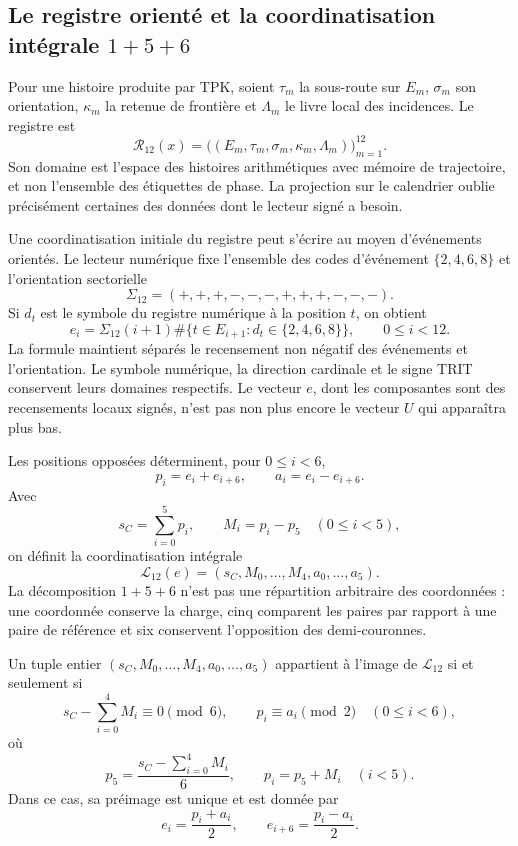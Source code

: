 \subsection{Le registre orienté et la coordinatisation intégrale \texorpdfstring{\(1+5+6\)}{1+5+6}}
\label{subsec:k-registro-integral}

Pour une histoire produite par TPK, soient \(\tau_m\) la sous-route sur
\(E_m\), \(\sigma_m\) son orientation, \(\kappa_m\) la retenue de
frontière et \(\Lambda_m\) le livre local des incidences. Le registre est
\[
 \mathcal R_{12}(x)=
 \bigl((E_m,\tau_m,\sigma_m,\kappa_m,\Lambda_m)\bigr)_{m=1}^{12}.
\]
Son domaine est l'espace des histoires arithmétiques avec mémoire de trajectoire, et non l'ensemble des
étiquettes de phase. La projection sur le calendrier oublie précisément certaines
des données dont le lecteur signé a besoin.

Une coordinatisation initiale du registre peut s’écrire au moyen d’événements
orientés. Le lecteur numérique fixe l’ensemble des codes d’événement
\(\{2,4,6,8\}\) et l’orientation sectorielle
\[
 \Sigma_{12}=(+,+,+,-,-,-,+,+,+,-,-,-).
\]
Si \(d_t\) est le symbole du registre numérique à la position \(t\), on obtient
\[
 e_i=\Sigma_{12}(i+1)
 \#\{t\in E_{i+1}:d_t\in\{2,4,6,8\}\},
 \qquad0\leq i<12.
\]
La formule maintient séparés le recensement non négatif des événements et l'orientation. Le symbole numérique, la direction cardinale et le signe TRIT conservent leurs domaines respectifs. Le vecteur \(e\), dont les composantes sont des recensements locaux signés, n'est pas non plus encore le vecteur \(U\) qui apparaîtra plus bas.

Les positions opposées déterminent, pour \(0\leq i<6\),
\[
 p_i=e_i+e_{i+6},\qquad a_i=e_i-e_{i+6}.
\]
Avec
\[
 s_C=\sum_{i=0}^{5}p_i,\qquad M_i=p_i-p_5\quad(0\leq i<5),
\]
on définit la coordinatisation intégrale
\[
 \mathcal L_{12}(e)
 =(s_C,M_0,\ldots,M_4,a_0,\ldots,a_5).
\]
La décomposition \(1+5+6\) n'est pas une répartition arbitraire des coordonnées :
une coordonnée conserve la charge, cinq comparent les paires par rapport à une
paire de référence et six conservent l'opposition des demi-couronnes.

\begin{lemma}
\label{lem:k-carta-integral}
Un tuple entier \((s_C,M_0,\ldots,M_4,a_0,\ldots,a_5)\) appartient à l'image de \(\mathcal L_{12}\) si et seulement si
\[
 s_C-\sum_{i=0}^{4}M_i\equiv0\pmod6,
 \qquad p_i\equiv a_i\pmod2\quad(0\leq i<6),
\]
où
\[
 p_5=\frac{s_C-\sum_{i=0}^{4}M_i}{6},\qquad p_i=p_5+M_i\quad(i<5).
\]
Dans ce cas, sa préimage est unique et est donnée par
\[
 e_i=\frac{p_i+a_i}{2},\qquad e_{i+6}=\frac{p_i-a_i}{2}.
\]
\end{lemma}

